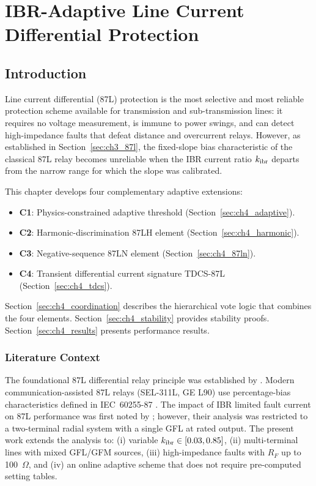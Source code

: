 \chapter{IBR-Adaptive Line Current Differential Protection}
\label{ch:line_diff}

\section{Introduction}
\label{sec:ch4_intro}

Line current differential (87L) protection is the most selective and most
reliable protection scheme available for transmission and sub-transmission
lines: it requires no voltage measurement, is immune to power swings, and
can detect high-impedance faults that defeat distance and overcurrent relays.
However, as established in Section~\ref{sec:ch3_87l}, the fixed-slope bias
characteristic of the classical 87L relay becomes unreliable when the IBR
current ratio $k_{\mathrm{ibr}}$ departs from the narrow range for which the slope
was calibrated.

This chapter develops four complementary adaptive extensions:
\begin{itemize}
\item \textbf{C1}: Physics-constrained adaptive threshold (Section~\ref{sec:ch4_adaptive}).
\item \textbf{C2}: Harmonic-discrimination 87LH element (Section~\ref{sec:ch4_harmonic}).
\item \textbf{C3}: Negative-sequence 87LN element (Section~\ref{sec:ch4_87ln}).
\item \textbf{C4}: Transient differential current signature TDCS-87L
      (Section~\ref{sec:ch4_tdcs}).
\end{itemize}

Section~\ref{sec:ch4_coordination} describes the hierarchical vote logic
that combines the four elements. Section~\ref{sec:ch4_stability} provides
stability proofs. Section~\ref{sec:ch4_results} presents performance results.

\subsection{Literature Context}

The foundational 87L differential relay principle was established by
\citet{Westinghouse1962}. Modern communication-assisted 87L relays
(SEL-311L, GE L90) use percentage-bias characteristics defined in
IEC~60255-87 \citep{IEC60255}. The impact of IBR limited fault current on
87L performance was first noted by \citet{Hooshyar2019}; however, their
analysis was restricted to a two-terminal radial system with a single GFL
at rated output. The present work extends the analysis to:
(i) variable $k_{\mathrm{ibr}} \in [0.03, 0.85]$,
(ii) multi-terminal lines with mixed GFL/GFM sources,
(iii) high-impedance faults with $R_F$ up to 100~$\Omega$, and
(iv) an online adaptive scheme that does not require pre-computed setting
tables.

